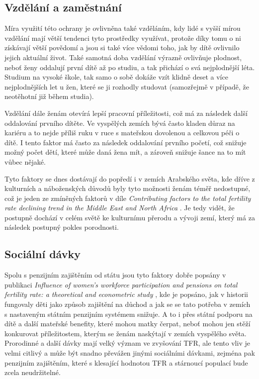 \documentclass[thesis=M,czech]{FITthesis}[2022/10/08]
\begin{document}
\subsection{Vzdělání a zaměstnání}

Míra využití této ochrany je ovlivněna také vzděláním, kdy lidé s vyšší mírou vzdělání mají větší tendenci tyto prostředky využívat, protože díky tomu o ni získávají větší povědomí a jsou si také více vědomi toho, jak by dítě ovlivnilo jejich aktuální život. Také samotná doba vzdělání výrazně ovlivňuje plodnost, neboť ženy oddalují první dítě až po studiu, a tak přichází o svá nejplodnější léta. Studium na vysoké škole, tak samo o sobě dokáže vzít klidně deset a více nejplodnějších let u žen, které se ji rozhodly studovat  (samozřejmě v případě, že neotěhotní již během studia).

Vzdělání dále ženám otevírá lepší pracovní příležitosti, což má za následek další oddalování prvního dítěte. Ve vyspělých zemích bývá často kladen důraz na kariéru a to nejde příliš ruku v ruce s mateřskou dovolenou a celkovou péči o dítě. I tento faktor má často za následek oddalování prvního početí, což snižuje možný počet dětí, které může daná žena mít, a zároveň snižuje šance na to mít vůbec nějaké.

Tyto faktory se dnes dostávají do popředí i v zemích Arabského světa, kde dříve z kulturních a náboženských důvodů byly tyto možnosti ženám téměř nedostupné, což je jeden ze zmíněných faktorů v díle \textit{Contributing factors to the total fertility rate declining trend in the Middle East and North Africa} \cite{Pourreza}. Je tedy vidět, že postupně dochází v celém světě ke kulturnímu přerodu a vývoji zemí, který má za následek postupný pokles porodnosti. 

\subsection{Sociální dávky}

Spolu s penzijním zajištěním od státu jsou tyto faktory dobře popsány v publikaci \textit{Influence of women’s workforce participation and pensions on total fertility rate: a theoretical and econometric study} \cite{Evan}, kde je popsáno, jak v historii fungovaly děti jako způsob zajištění na důchod a jak se se tato potřeba v zemích s nastaveným státním penzijním systémem snižuje. A to i přes státní podporu na dítě a další mateřské benefity, které mohou matky čerpat, neboť mohou jen stěží konkurovat příležitostem, kterým se ženám naskýtají v zemích vyspělého světa. Prorodinné a další dávky mají velký význam ve zvyšování TFR, ale tento vliv je velmi citlivý a může být snadno převážen jinými sociálními dávkami, zejména pak penzijním zajištěním, které s klesající hodnotou TFR a stárnoucí populací bude zcela neudržitelné. 
\end{document}
